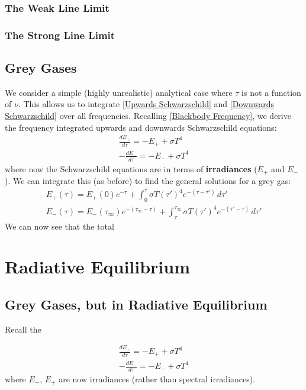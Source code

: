 \subsection{The Weak Line Limit}

\subsection{The Strong Line Limit}

\section{Grey Gases}

We consider a simple (highly unrealistic) analytical case where $\tau$ is not a function of $\nu$. This allows us to integrate \ref{Upwards Schwarzschild} and \ref{Downwards Schwarzschild} over all frequencies. Recalling \ref{Blackbody Frequency}, we derive the frequency integrated upwards and downwards Schwarzschild equations:
\begin{align}
    \frac{dE_+}{d\tau}=-E_++\sigma T^4 \label{Upwards Grey}\\
    -\frac{dE_-}{d\tau}=-E_-+\sigma T^4\label{Downwards Grey}
\end{align}
where now the Schwarzschild equations are in terms of \textbf{irradiances} ($E_+$ and $E_-$). We can integrate this (as before) to find the general solutions for a grey gas:
\begin{align}
    E_+(\tau)=E_+(0)e^{-\tau}+
    \int_0^{\tau}
    \sigma T(\tau')^4
    e^{-(\tau-\tau')}
    \,d\tau'\label{Upwards Soln Grey General}
    \\
    E_-(\tau)=E_-(\tau_\infty)
    e^{-(\tau_\infty-\tau)}
    +
    \int_{\tau}^{\tau_\infty}
    \sigma T(\tau')^4
    e^{-(\tau'-\tau)}
    \,d\tau' 
    \label{Downwards Soln Grey General}
\end{align}
We can now see that the total 

 
\chapter{Radiative Equilibrium}

\section{Grey Gases, but in Radiative Equilibrium}

Recall the 

\begin{align*}
    \frac{dE_+}{d\tau}=-E_++\sigma T^4 \\
    -\frac{dE_-}{d\tau}=-E_-+\sigma T^4
\end{align*}
where $E_+$, $E_+$ are now irradiances (rather than spectral irradiances).

